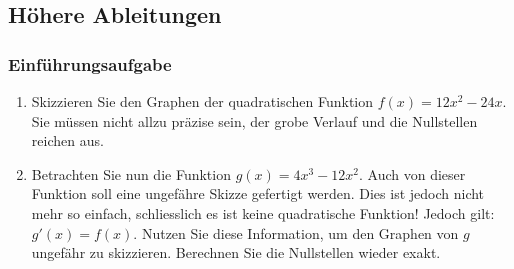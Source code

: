 \subsection{Höhere Ableitungen}
\subsubsection*{Einführungsaufgabe}
\begin{enumerate}
    \item Skizzieren Sie den Graphen der quadratischen Funktion $f(x)=12x^2-24x$. Sie müssen nicht allzu präzise sein, der grobe Verlauf und die Nullstellen reichen aus.

          \begin{center}
          \end{center}

    \item Betrachten Sie nun die Funktion $g(x)=4x^3-12x^2$. Auch von dieser Funktion soll eine ungefähre Skizze gefertigt werden. Dies ist jedoch nicht mehr so einfach, schliesslich es ist keine quadratische Funktion! Jedoch gilt: $g'(x)=f(x)$. Nutzen Sie diese Information, um den Graphen von $g$ ungefähr zu skizzieren. Berechnen Sie die Nullstellen wieder exakt.

          \begin{center}
\end{center}
\end{enumerate}
